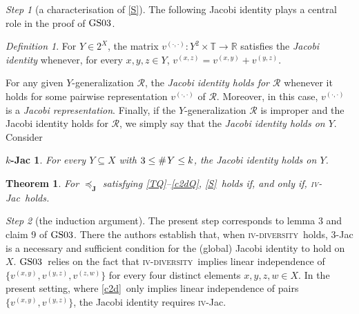 \documentclass[ecta,nameyear,draft]{econsocart}
\newcommand{\countof}{\mathbin{\#}\hskip1pt}
\newcommand{\R}{\mathbb R}
\newcommand{\mc}{\mathcal}
\newcommand{\ext}{\mathrel{\mc R}}
\newcommand{\mbbt}{{\mathbf {T}}}
\newcommand{\mbbtpp}{{\mathds{T}}}
\newcommand{\mbbj}{\mathbf J}
\newcommand{\xy}{{(x, y)}}
\newcommand{\yz}{{(y,z)}}
\newcommand{\xz}{{(x,z)}}
\newcommand{\zw}{(z,w)}
\newcommand{\dd}{{(\cdot,\cdot)}}
\newcommand{\stability}{\ref{S}}
\newcommand{\fourdiv}{\textsc{iv}-\textsc{diversity}}
\newcommand{\fourjac}{\textup{\textsc{iv}-Jac}}
\newcommand{\gsii}{$\textup{GS03}$}
\theoremstyle{plain}
\newtheorem{theorem}{Theorem}%
\newtheorem{corollary}{Corollary}[theorem]
\newtheorem*{k-jac*}{$k$-Jac}
\theoremstyle{remark}
\newtheorem{step}{Step}[section]
\newtheorem*{definition*}{Definition}
\begin{document}
\begin{appendix}
  \begin{step}[a characterisation of \stability] \label{step-stability} The
    following Jacobi identity plays a central role in the proof of \gsii.
    \begin{definition*}%
      For $Y \in 2^{X}$, the matrix $v^{\dd} : Y^{2}\times \mbbtpp \rightarrow
      \R$ satisfies the \emph{Jacobi identity} whenever, for every $x , y , z
      \in Y$, $v^{\xz} = v^{\xy} + v^{\yz}$.
    \end{definition*}
    For any given $Y$-generalization $\ext$, the \emph{Jacobi identity holds
    for $\ext$} whenever it holds for some pairwise representation $v^{\dd}$ of
    $\ext$. Moreover, in this case, $v^{\dd}$ is a \emph{Jacobi
    representation}. Finally, if the $Y$-generalization $\ext$ is improper
    and the Jacobi identity holds for $\ext$, we simply say that the
    \emph{Jacobi identity holds on $Y$}.  Consider
    \begin{k-jac*}
      For every $Y \subseteq X$ with $3 \leq \countof Y \leq k$, the Jacobi
      identity holds on $Y$.
    \end{k-jac*}
    \begin{theorem}\label{thm-foureq} For $\preceq_{\mbbj}$ satisfying
      \ref{TQ}--\ref{c2dQ}, \stability\ holds if, and only if, \fourjac\ holds.
    \end{theorem}
  \end{step}
  \begin{step}[the induction argument]\label{step-induction} The present step
    corresponds to lemma 3 and claim 9 of \gsii. There the authors establish
    that, when \fourdiv\ holds, $3$-Jac is a necessary and sufficient condition
    for the (global) Jacobi identity to hold on $X$.  \gsii\ relies on the fact
    that \fourdiv\ implies linear independence of $\{v^{\xy},v^{\yz},
    v^{\zw}\}$ for every four distinct elements $x,y,z,w \in X$. In the present
    setting, where \ref{c2d}\ only implies linear independence of pairs
    $\{v^{\xy},v^{\yz}\}$, the Jacobi identity requires \fourjac.


\end{step}
\end{appendix}
\end{document}
